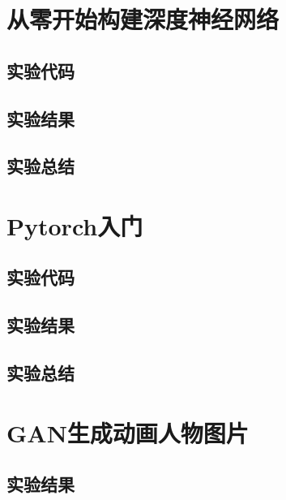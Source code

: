 \documentclass{ds201}
\begin{document}

\makecover


\section{从零开始构建深度神经网络}

\subsection{实验代码}

\subsection{实验结果}

\subsection{实验总结}

\section{Pytorch入门}

\subsection{实验代码}

\subsection{实验结果}

\subsection{实验总结}

\section{GAN生成动画人物图片}

\subsection{实验结果}
\end{document}
